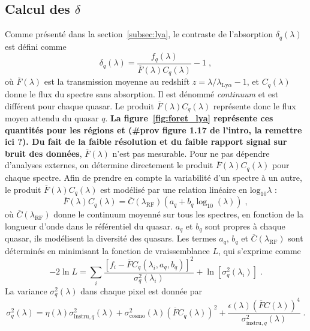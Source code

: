 \documentclass[11pt, twoside, a4paper, openright]{report}
\begin{document}
\subsection{Calcul des $\delta$}
Comme présenté dans la section~\ref{subsec:lya}, le contraste de l'absorption \lya{} $\delta_q(\lambda)$ est défini comme
\begin{equation}
  \label{eq:deltaF}
  \delta_q(\lambda) = \frac{f_q(\lambda)}{\overline F(\lambda) C_q(\lambda)} - 1 \;,
\end{equation}
où $\overline F(\lambda)$ est la transmission moyenne au redshift $z = \lambda / \lambda_{\mathrm{Ly}\alpha} - 1$, et $C_q(\lambda)$ donne le flux du spectre sans absorption. Il est dénommé \emph{continuum} et est différent pour chaque quasar.
Le produit $\overline F(\lambda) C_q(\lambda)$ représente donc le flux moyen attendu du quasar $q$.
\textbf{La figure~\ref{fig:foret_lya} représente ces quantités pour les régions \lya{} et \lyb{} (\#prov figure 1.17 de l'intro, la remettre ici ?).
Du fait de la faible résolution et du faible rapport signal sur bruit des données}, $\overline F(\lambda)$ n'est pas mesurable. Pour ne pas dépendre d'analyses externes, on détermine directement le produit $\overline F(\lambda) C_q(\lambda)$ pour chaque spectre.
Afin de prendre en compte la variabilité d'un spectre à un autre, le produit $\overline F(\lambda) C_q(\lambda)$ est modélisé par une relation linéaire en $\mathrm{log}_{10} \lambda$ :
\begin{equation}
  \label{eq:diversity}
  \overline F(\lambda) C_q(\lambda) = \overline C(\lambda_{\mathrm{RF}})(a_q + b_q \log_{10}(\lambda)) \; ,
\end{equation}
où $\overline C(\lambda_{\mathrm{RF}})$ donne le continuum moyenné sur tous les spectres, en fonction de la longueur d'onde dans le référentiel du quasar. $a_q$ et $b_q$ sont propres à chaque quasar, ils modélisent la diversité des quasars.
Les termes $a_q$, $b_q$ et $\overline C(\lambda_{\mathrm{RF}})$ sont déterminés en minimisant la fonction de vraissemblance $L$, qui s'exprime comme
\begin{equation}
  \label{eq:likelihood}
  - 2 \ln L = \sum\limits_{i} \frac{\left[f_{i} - \overline F C_q(\lambda_{i}, a_q, b_q)\right]^2}{\sigma_q^2 (\lambda_i)} + \ln [\sigma_q^2 (\lambda_i)] \;  .
\end{equation}
La variance $\sigma_q^2(\lambda)$ dans chaque pixel est donnée par
\begin{equation}
  \label{eq:variance}
  \sigma_q^2(\lambda) = \eta(\lambda) \sigma_{\mathrm{instru}, q}^2(\lambda) + \sigma_{\mathrm{cosmo}}^2 (\lambda) (\overline F C_q(\lambda))^2 + \frac{\epsilon(\lambda)(\overline F C(\lambda))^4}{\sigma_{\mathrm{instru},q}^2 (\lambda)}  \; .
\end{equation}
\end{document}
